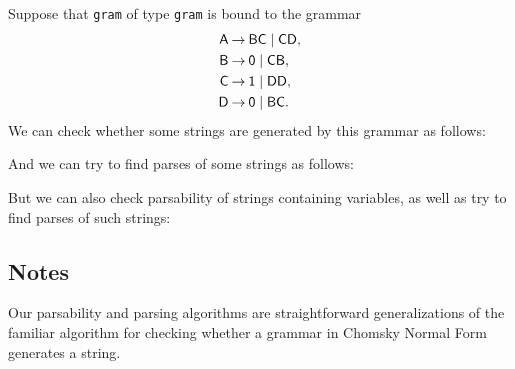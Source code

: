Suppose that \texttt{gram} of type \texttt{gram} is bound to the grammar
\begin{align*}
\mathsf{A} &\mathbin{\to} \mathsf{B}\mathsf{C}\mid \mathsf{C}\mathsf{D} , \\
\mathsf{B} &\mathbin{\to} \mathsf{0}\mid \mathsf{C}\mathsf{B} , \\
\mathsf{C} &\mathbin{\to} \mathsf{1}\mid \mathsf{D}\mathsf{D} , \\
\mathsf{D} &\mathbin{\to} \mathsf{0}\mid \mathsf{B}\mathsf{C} .
\end{align*}
We can check whether some strings are generated by this grammar
as follows:

And we can try to find parses of some strings as follows:

But we can also check parsability of strings containing variables, as well
as try to find parses of such strings:


\subsection{Notes}

Our parsability and parsing algorithms are straightforward generalizations of
the familiar algorithm for checking whether a grammar in Chomsky Normal Form
generates a string.

%

